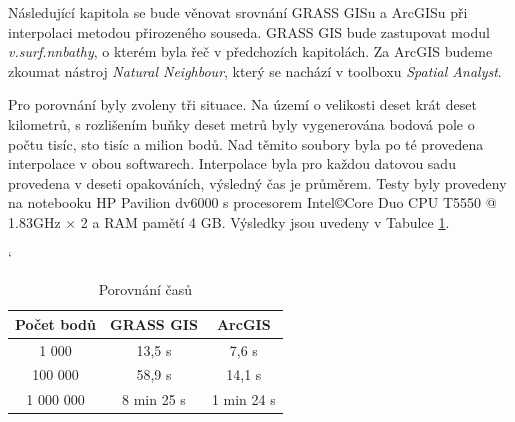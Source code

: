 \documentclass[12pt,a4paper]{article}
\begin{document}
Následující kapitola se bude věnovat srovnání GRASS GISu a ArcGISu při interpolaci metodou přirozeného souseda. GRASS GIS bude zastupovat modul \emph{v.surf.nnbathy}, o kterém byla řeč v předchozích kapitolách. Za ArcGIS budeme zkoumat nástroj \emph{Natural Neighbour}, který se nachází v toolboxu \emph{Spatial Analyst}. 

Pro porovnání byly zvoleny tři situace. Na území o velikosti deset krát deset kilometrů, s rozlišením buňky deset metrů byly vygenerována bodová pole o počtu tisíc, sto tisíc a milion bodů. Nad těmito soubory byla po té provedena interpolace v obou softwarech. Interpolace byla pro každou datovou sadu provedena v deseti opakováních, výsledný čas je průměrem. Testy byly provedeny na notebooku HP Pavilion dv6000 s procesorem Intel\copyright  Core Duo CPU T5550 @ 1.83GHz $\times$ 2 a RAM pamětí 4 GB. Výsledky jsou uvedeny v Tabulce \ref{tab:GRASSxArc}.

\bigskip
\begin{table}[h]
\catcode`
\begin{tabular}{|c|c|c|}
\hline
Počet bodů & GRASS GIS  & ArcGIS     \\ \hline
1 000       & 13,5 s     & 7,6 s      \\ \hline
100 000     & 58,9 s     & 14,1 s     \\ \hline
1 000 000    & 8 min 25 s & 1 min 24 s \\ \hline
\end{tabular}
\caption{Porovnání časů}
\label{tab:GRASSxArc}
\end{table}
\end{document}
